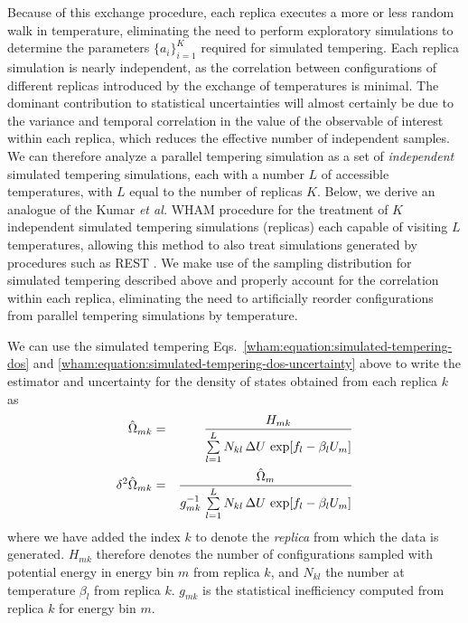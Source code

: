 Because of this exchange procedure, each replica executes a more or less random walk in temperature, eliminating the need to perform exploratory simulations to determine the parameters $\{a_i\}_{i=1}^K$ required for simulated tempering.  Each replica simulation is nearly independent, as the correlation between configurations of different replicas introduced by the exchange of temperatures is minimal.  The dominant contribution to statistical uncertainties will almost certainly be due to the variance and temporal correlation in the value of the observable of interest within each replica, which reduces the effective number of independent samples. We can therefore analyze a parallel tempering simulation as a set of \emph{independent} simulated tempering simulations, each with a number $L$ of accessible temperatures, with $L$ equal to the number of replicas $K$.  Below, we derive an analogue of the Kumar \emph{et al.} WHAM procedure for the treatment of $K$ independent simulated tempering simulations (replicas) each capable of visiting $L$ temperatures, allowing this method to also treat simulations generated by procedures such as REST \cite{mitsutake:2000a}.  We make use of the sampling distribution for simulated tempering described above and properly account for the correlation within each replica, eliminating the need to artificially reorder configurations from parallel tempering simulations by temperature.

We can use the simulated tempering Eqs.\ \ref{wham:equation:simulated-tempering-dos} and \ref{wham:equation:simulated-tempering-dos-uncertainty} above to write the estimator and uncertainty for the density of states obtained from each replica $k$ as
\begin{eqnarray}
\hat{\Omega}_{mk} &=& \frac{H_{mk}}{\sum\limits_{l=1}^L N_{kl} \, \Delta U \, \exp[f_l - \beta_l U_m]} \\
\delta^2 \hat{\Omega}_{mk} &=& \frac{\hat{\Omega}_m}{g_{mk}^{-1} \, \sum\limits_{l=1}^L N_{kl} \, \Delta U \, \exp[f_l - \beta_l U_m]}
\end{eqnarray}
where we have added the index $k$ to denote the \emph{replica} from which the data is generated.  $H_{mk}$ therefore denotes the number of configurations sampled with potential energy in energy bin $m$ from replica $k$, and $N_{kl}$ the number at temperature $\beta_l$ from replica $k$.  $g_{mk}$ is the statistical inefficiency computed from replica $k$ for energy bin $m$.

